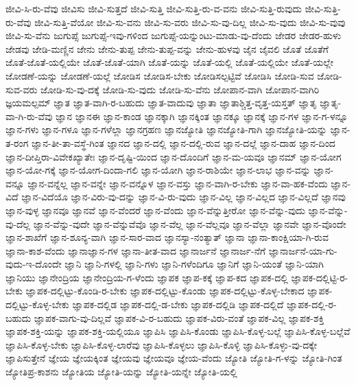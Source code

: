 {ಜೀವಿ-ಸಿ-ರು-ವೆವು
ಜೀವಿಸು
ಜೀವಿ-ಸುತ್ತದೆ
ಜೀವಿ-ಸುತ್ತಿ
ಜೀವಿ-ಸುತ್ತಿ-ರು-ವ-ವನು
ಜೀವಿ-ಸುತ್ತಿ-ರುವುದು
ಜೀವಿ-ಸುತ್ತಿ-ರು-ವೆವು
ಜೀವಿ-ಸುತ್ತಿ-ವೆಯೋ
ಜೀವಿ-ಸು-ವನು
ಜೀವಿ-ಸು-ವರು
ಜೀವಿ-ಸು-ವು-ದಿಲ್ಲ
ಜೀವಿ-ಸು-ವುದು
ಜೀವಿ-ಸು-ವುವು
ಜೀವಿ-ಸು-ವೆನು
ಜುಗುಪ್ಸೆ
ಜುಗುಪ್ಸೆ-ಇವು-ಗಳಿಂದ
ಜುಗುಪ್ಸೆ-ಯನ್ನುಂಟು-ಮಾಡು-ವು-ದೆಂದು
ಜೇಡರ
ಜೇಡರ-ಹುಳು
ಜೇಡವು
ಜೇಡಿ-ಮಣ್ಣಿನ
ಜೇನು
ಜೇನು-ತುಪ್ಪ
ಜೇನು-ತುಪ್ಪ-ವನ್ನು
ಜೇನು-ಹುಳವು
ಜೈನ
ಜೈವಲಿ
ಜೊತೆ
ಜೊತೆಗೆ
ಜೊತೆ-ಜೊತೆ-ಯಲ್ಲಿಯೇ
ಜೊತೆ-ಜೊತೆ-ಯಾಗಿ
ಜೊತೆ-ಯನ್ನು
ಜೊತೆ-ಯಲ್ಲಿ
ಜೊತೆ-ಯಲ್ಲಿಯೇ
ಜೊತೆ-ಯಲ್ಲೇ
ಜೋಡಣೆ-ಯನ್ನು
ಜೋಡಣೆ-ಯಲ್ಲೆ
ಜೋಡಿಸ
ಜೋಡಿಸ-ಬೇಕು
ಜೋಡಿಸಲ್ಪಟ್ಟಿವೆ
ಜೋಡಿಸಿ
ಜೋಡಿ-ಸುವ
ಜೋಡಿ-ಸುವ-ವರು
ಜೋಡಿ-ಸು-ವು-ದಕ್ಕೆ
ಜೋಡಿ-ಸು-ವುದು
ಜೋಡಿ-ಸು-ವೆನು
ಜೋಪಾನ-ವಾಗಿ
ಜೋಪಾನ-ವಾಗಿರಿ
ಜ್ಞಯಮಲ್ಪಮ್
ಜ್ಞಾತ
ಜ್ಞಾತ-ವಾಗಿ-ರ-ಬಹುದು
ಜ್ಞಾತ-ವಾದುವು
ಜ್ಞಾತಾ
ಜ್ಞಾತಾಶ್ಚಿತ್ತ-ವೃತ್ತ-ಯಸ್ತತ್
ಜ್ಞಾತೃ
ಜ್ಞಾತೃ-ವಾ-ಗಿ-ರು-ವೆವು
ಜ್ಞಾನ
ಜ್ಞಾನಈ
ಜ್ಞಾನ-ಕಾಂಡ
ಜ್ಞಾನಕ್ಕಾಗಿ
ಜ್ಞಾನಕ್ಕಿಂತ
ಜ್ಞಾನಕ್ಕೂ
ಜ್ಞಾನಕ್ಕೆ
ಜ್ಞಾನ-ಗಳ
ಜ್ಞಾನ-ಗ-ಳನ್ನೂ
ಜ್ಞಾನ-ಗಳು
ಜ್ಞಾನ-ಗಳೂ
ಜ್ಞಾನ-ಗಳೆಲ್ಲಾ
ಜ್ಞಾನಗ್ರಹಣ
ಜ್ಞಾನಜ್ಯೋತಿ
ಜ್ಞಾನಜ್ಯೋತಿ-ಗಾಗಿ
ಜ್ಞಾನಜ್ಯೋತಿ-ಯನ್ನು
ಜ್ಞಾನ-ತ-ರಂಗ
ಜ್ಞಾನ-ತೀ-ತಾ-ವಸ್ಥೆ-ಗಿಂತ
ಜ್ಞಾನದ
ಜ್ಞಾನ-ದಲ್ಲಿ
ಜ್ಞಾನ-ದಲ್ಲಿ-ರುವ
ಜ್ಞಾನ-ದಲ್ಲೆ
ಜ್ಞಾನ-ದಾಹ
ಜ್ಞಾನ-ದಿಂದ
ಜ್ಞಾನ-ದೀಪ್ತಿರಾ-ವಿವೇಕಖ್ಯಾತೇಃ
ಜ್ಞಾನ-ದೃಷ್ಟಿ-ಯಿಂದ
ಜ್ಞಾನ-ದೊಂದಿಗೆ
ಜ್ಞಾನ-ಮ-ಯವೂ
ಜ್ಞಾನಮ್
ಜ್ಞಾನ-ಯೋಗ
ಜ್ಞಾನ-ಯೋ-ಗಕ್ಕೆ
ಜ್ಞಾನ-ಯೋಗ-ದಿಂದಾ-ಗಲಿ
ಜ್ಞಾನ-ಯೋಗಿ
ಜ್ಞಾನ-ರಾಶಿಯೇ
ಜ್ಞಾನ-ಲಾಭ
ಜ್ಞಾನ-ವನ್ನು
ಜ್ಞಾನ-ವನ್ನೂ
ಜ್ಞಾನ-ವನ್ನೆಲ್ಲ
ಜ್ಞಾನ-ವನ್ನೇ
ಜ್ಞಾನ-ವನ್ನೊಳ
ಜ್ಞಾನ-ವಸ್ತು
ಜ್ಞಾನ-ವಾಗಿ-ರ-ಬೇಕು
ಜ್ಞಾನ-ವಾ-ಹಕ-ವೆಂದು
ಜ್ಞಾನ-ವಿದೆ
ಜ್ಞಾನ-ವಿದೆಯೊ
ಜ್ಞಾನ-ವಿರು-ವು-ದನ್ನು
ಜ್ಞಾನ-ವಿ-ರು-ವುದು
ಜ್ಞಾನ-ವಿಲ್ಲ
ಜ್ಞಾನ-ವಿಲ್ಲದ
ಜ್ಞಾನ-ವಿಲ್ಲದೆ
ಜ್ಞಾನವು
ಜ್ಞಾನ-ವುಳ್ಳ
ಜ್ಞಾನವೂ
ಜ್ಞಾನವೆ
ಜ್ಞಾನ-ವೆಂದರೆ
ಜ್ಞಾನ-ವೆಂದು
ಜ್ಞಾನ-ವೆನ್ನುತ್ತೀರೋ
ಜ್ಞಾನ-ವೆನ್ನು-ವುದು
ಜ್ಞಾನ-ವೆನ್ನು-ವು-ದೆಲ್ಲ
ಜ್ಞಾನ-ವೆನ್ನು-ವುದೇ
ಜ್ಞಾನ-ವೆನ್ನುವೆವೊ
ಜ್ಞಾನ-ವೆಲ್ಲ
ಜ್ಞಾನ-ವೆಲ್ಲವೂ
ಜ್ಞಾನ-ವೆಲ್ಲಾ
ಜ್ಞಾನವೇ
ಜ್ಞಾನ-ವೊಂದೇ
ಜ್ಞಾನ-ಶಾಖೆಗೆ
ಜ್ಞಾನ-ಶೂನ್ಯ-ವಾಗಿ
ಜ್ಞಾನ-ಸಾರ-ವಾದ
ಜ್ಞಾನಸ್ಯಾ-ನಂತ್ಯಾತ್
ಜ್ಞಾನಾ
ಜ್ಞಾನಾ-ಕಾಂಕ್ಷಿಯಾ-ಗಿ-ರುವ
ಜ್ಞಾನಾ-ಕಾಶ-ವೆಂದು
ಜ್ಞಾನಾಜ್ಞಾನ-ಗಳ
ಜ್ಞಾನಾ-ತೀತ-ವಾದ
ಜ್ಞಾನಾರ್ಜನೆ
ಜ್ಞಾನಾರ್ಜ-ನೆಗೆ
ಜ್ಞಾನಾರ್ಜನೆ-ಯಾ-ಗು-ವುದು-ಇ-ದೊಂದೇ
ಜ್ಞಾನಿ
ಜ್ಞಾನಿ-ಗಳಲ್ಲಿ
ಜ್ಞಾನಿ-ಗಳು
ಜ್ಞಾನಿ-ಗಳೆಂದಿಗೂ
ಜ್ಞಾನಿಗೆ
ಜ್ಞಾನಿ-ಯಂತೆ
ಜ್ಞಾನಿ-ಯಾಗಿ
ಜ್ಞಾನಿಯು
ಜ್ಞಾನೇಂದ್ರಿಯ
ಜ್ಞಾನೇಂದ್ರಿಯ-ಗ-ಳೆಂದು
ಜ್ಞಾಪಕ
ಜ್ಞಾಪ-ಕಕ್ಕೆ
ಜ್ಞಾಪ-ಕದ
ಜ್ಞಾಪಕ-ದಲ್ಲಿ
ಜ್ಞಾಪಕ-ದಲ್ಲಿಟ್ಟಿ-ರ-ಬೇಕು
ಜ್ಞಾಪಕ-ದಲ್ಲಿಟ್ಟು-ಕೊಂಡಿ-ರ-ಬೇಕು
ಜ್ಞಾಪಕ-ದಲ್ಲಿಟ್ಟು-ಕೊಂಡು
ಜ್ಞಾಪಕ-ದಲ್ಲಿಟ್ಟು-ಕೊಳ್ಳ-ಬೇಕಾದ
ಜ್ಞಾಪಕ-ದಲ್ಲಿಟ್ಟು-ಕೊಳ್ಳ-ಬೇಕು
ಜ್ಞಾಪಕ-ದಲ್ಲಿಡ
ಜ್ಞಾಪಕ-ದಲ್ಲಿ-ಡ-ಬೇಕು
ಜ್ಞಾಪಕ-ದಲ್ಲಿಡಿ
ಜ್ಞಾಪಕ-ದಲ್ಲಿದೆ
ಜ್ಞಾಪಕ-ದಲ್ಲಿ-ರ-ಬಹುದು
ಜ್ಞಾಪಕ-ವಾಗು-ವು-ದಿಲ್ಲವೆ
ಜ್ಞಾಪಕ-ವಿ-ರ-ಬಹುದು
ಜ್ಞಾಪಕ-ವಿರು-ವಂತೆ
ಜ್ಞಾಪಕ-ವಿಲ್ಲ
ಜ್ಞಾಪಕ-ಶಕ್ತಿ
ಜ್ಞಾಪಕ-ಶಕ್ತಿ-ಯನ್ನು
ಜ್ಞಾಪಕ-ಶಕ್ತಿ-ಯಲ್ಲಿಯೂ
ಜ್ಞಾಪಿಸಿ
ಜ್ಞಾಪಿಸಿ-ಕೊಂಡು
ಜ್ಞಾಪಿಸಿ-ಕೊಳ್ಳ-ಬಲ್ಲೆ
ಜ್ಞಾಪಿಸಿ-ಕೊಳ್ಳ-ಬಲ್ಲೆವೆ
ಜ್ಞಾಪಿಸಿ-ಕೊಳ್ಳ-ಬೇಕು
ಜ್ಞಾಪಿಸಿ-ಕೊಳ್ಳ-ಲಾರೆವು
ಜ್ಞಾಪಿಸಿ-ಕೊಳ್ಳಲು
ಜ್ಞಾಪಿಸಿ-ಕೊಳ್ಳಿ
ಜ್ಞಾಪಿಸಿ-ಕೊಳ್ಳು-ವು-ದಕ್ಕೇ
ಜ್ಞಾಪಿಸುತ್ತೇನೆ
ಜ್ಞೇಯ
ಜ್ಞೇಯಕ್ಕಿಂತ
ಜ್ಞೇಯವು
ಜ್ಞೇಯವೂ
ಜ್ಞೇಯ-ವೆಂದು
ಜ್ಯೋತಿ
ಜ್ಯೋತಿ-ಗ-ಳನ್ನು
ಜ್ಯೋತಿ-ಗಿಂತ
ಜ್ಯೋತಿಪ್ರ-ಕಾಶನು
ಜ್ಯೋತಿಯ
ಜ್ಯೋತಿ-ಯನ್ನು
ಜ್ಯೋತಿ-ಯನ್ನೇ
ಜ್ಯೋತಿ-ಯಲ್ಲಿ
}
